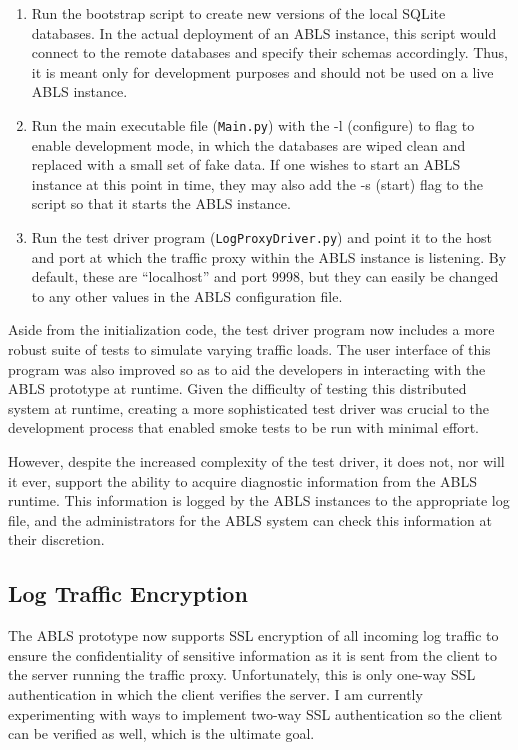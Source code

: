 \documentclass{sig-alternate}
\begin{document}
\begin{enumerate}
	\item Run the bootstrap script to create new versions of the local SQLite databases. In the actual deployment of an ABLS instance, this script would connect to the remote databases and specify their schemas accordingly. Thus, it is meant only for development purposes and should not be used on a live ABLS instance.
	\item Run the main executable file ({\tt Main.py}) with the -l (configure) to flag to enable development mode, in which the databases are wiped clean and replaced with a small set of fake data. If one wishes to start an ABLS instance at this point in time, they may also add the -s (start) flag to the script so that it starts the ABLS instance.
	\item Run the test driver program ({\tt LogProxyDriver.py}) and point it to the host and port at which the traffic proxy within the ABLS instance is listening. By default, these are ``localhost'' and port 9998, but they can easily be changed to any other values in the ABLS configuration file. 
\end{enumerate}

Aside from the initialization code, the test driver program now includes a more robust suite of tests to simulate varying traffic 
loads. The user interface of this program was also improved so as to aid the developers in interacting with the ABLS 
prototype at runtime. Given the difficulty of testing this distributed system at runtime, creating a more sophisticated
test driver was crucial to the development process that enabled smoke tests to be run with minimal effort.

However, despite the increased complexity of the test driver, it does not, nor will it ever, support the ability to acquire 
diagnostic information from the ABLS runtime. This information is logged by the ABLS instances to the appropriate log 
file, and the administrators for the ABLS system can check this information at their discretion.

\subsection{Log Traffic Encryption}
The ABLS prototype now supports SSL encryption of all incoming log traffic to ensure the confidentiality of sensitive
information as it is sent from the client to the server running the traffic proxy. Unfortunately, this is only one-way SSL 
authentication in which the client verifies the server. I am currently experimenting with ways to implement two-way 
SSL authentication so the client can be verified as well, which is the ultimate goal. 
\end{document}
